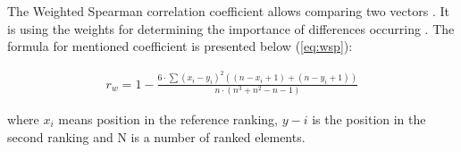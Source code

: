 The Weighted Spearman correlation coefficient allows comparing two vectors \cite{kizielewicz2020identification}. It is using the weights for determining the importance of differences occurring \cite{costa2011weighted,kizielewicz2021study}. The formula for mentioned coefficient is presented below (\ref{eq:wsp}):

\begin{equation}
\begin{array}{lcl}
r_{w}=1-\frac{6 \cdot \sum (x_{i} - y_{i})^{2}((n - x_{i}+1)+(n-y_{i}+1))}{n \cdot\left(n^{3} + n^{2} - n -1\right)}
\end{array}
\label{eq:wsp}
\end{equation}

where $x_i$ means position in the reference ranking, $y-i$ is the position in the second ranking and N is a number of ranked elements.